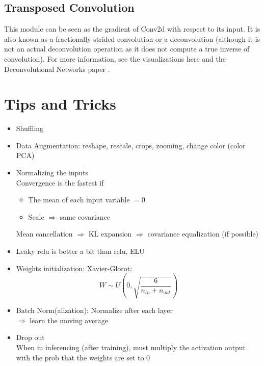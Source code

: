 \subsection{Transposed Convolution}
This module can be seen as the gradient of Conv2d with respect to its input. It is also known as a fractionally-strided convolution or a deconvolution (although it is not an actual deconvolution operation as it does not compute a true inverse of convolution). For more information, see the visualizations here \cite{dumoulin2016guide} and the Deconvolutional Networks paper \cite{zeiler2010deconvolutional}.

\section{Tips and Tricks}
\begin{itemize}
	\item Shuffling
	\item Data Augmentation: reshape, rescale, crops, zooming, change color (color \ac{PCA})
	\item Normalizing the inputs\\
	Convergence is the fastest if
	\begin{itemize}
		\item The mean of each input variable $=0$
		\item Scale $\Rightarrow$ same covariance
	\end{itemize}
	Mean cancellation $\Rightarrow$ \ac{KL} expansion $\Rightarrow$ covariance equalization (if possible)
	\item Leaky \ac{relu} is better a bit than \ac{relu}, ELU
	\item Weights initialization: Xavier-Glorot:
	\[ W \sim U\left(0, \sqrt{\frac{6}{n_{in} + n_{out}}}\right) \]
	\item Batch Norm(alization): Normalize after each layer\\
	$\Rightarrow$ learn the moving average
	\item Drop out\\
	\note When in inferencing (after training), must multiply the activation output with the \ac{prob} that the weights are set to 0
\end{itemize}
